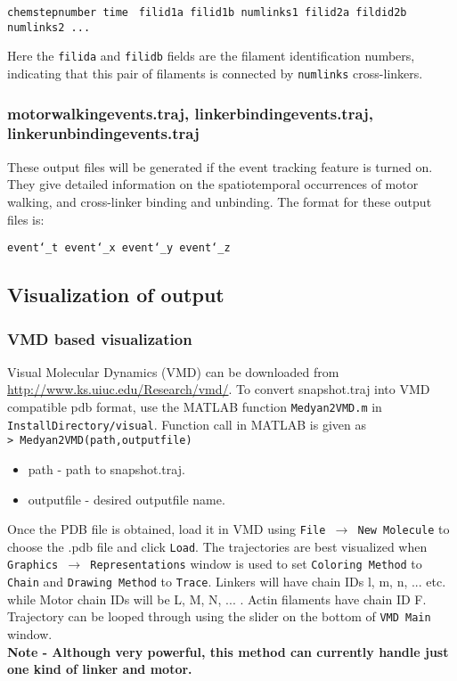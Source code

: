 \documentclass[11pt, oneside]{article}   	%
\begin{document}
\noindent\texttt{chemstepnumber time }\newline
\texttt{filid1a filid1b numlinks1 filid2a fildid2b numlinks2 ... }\newline

Here the \texttt{filida} and \texttt{filidb} fields are the filament identification numbers, indicating that this pair of filaments is connected by \texttt{numlinks} cross-linkers.   

\subsubsection{motorwalkingevents.traj, linkerbindingevents.traj, linkerunbindingevents.traj}
These output files will be generated if the event tracking feature is turned on.  They give detailed information on the spatiotemporal occurrences of motor walking, and cross-linker binding and unbinding.  The format for these output files is:\newline

\noindent\texttt{event\char`_t event\char`_x event\char`_y event\char`_z }\newline

\subsection{Visualization of output}
\subsubsection{VMD based visualization}
Visual Molecular Dynamics (VMD) can be downloaded from \url{http://www.ks.uiuc.edu/Research/vmd/}. To convert snapshot.traj into VMD compatible pdb format, use the MATLAB function \texttt{Medyan2VMD.m} in \texttt{InstallDirectory/visual}.
Function call in MATLAB is given as \\ \newline
\texttt{> Medyan2VMD(path,outputfile)}
\begin{itemize}
\item path - path to snapshot.traj.
\item outputfile - desired outputfile name.
\end{itemize}

\noindent Once the PDB file is obtained, load it in VMD using \texttt{File $\rightarrow$ New Molecule} to choose the  .pdb file and click \texttt{Load}. 
The trajectories are best visualized when \texttt{Graphics $\rightarrow$ Representations} window is used to set \texttt{Coloring Method} to \texttt{Chain} and \texttt{Drawing Method} to \texttt{Trace}. Linkers will have chain IDs l, m, n, ... etc. while Motor chain IDs will be L, M, N, ... . Actin filaments have chain ID F.  Trajectory can be looped through using the slider on the bottom of \texttt{VMD Main} window. \\ \newline
\textbf{Note -  Although very powerful, this method can currently handle just one kind of linker and motor.}
\end{document}
